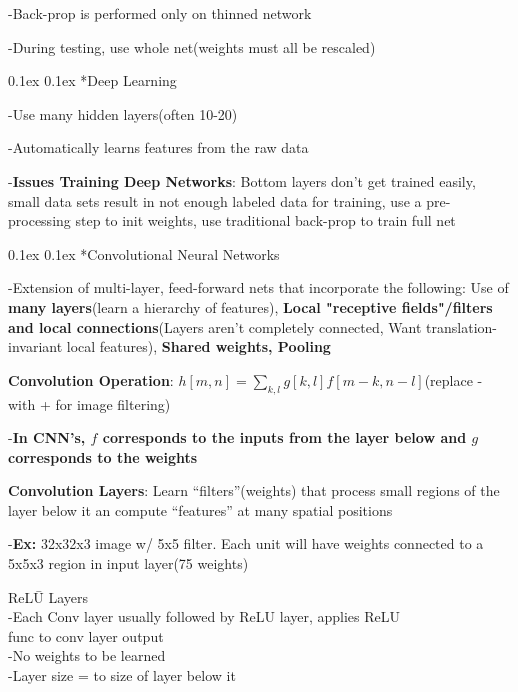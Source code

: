 \documentclass[10pt,landscape]{article}
\makeatletter
\renewcommand{\subsection}{\@startsection{subsection}{2}{0mm}%
                                {0.1ex}%
                                {0.1ex}%
                                {\normalfont\footnotesize\bfseries}}
\makeatother
\begin{document}
\begin{multicols}{3}
-Back-prop is performed only on thinned network

-During testing, use whole net(weights must all be rescaled)

\subsection{*Deep Learning}

-Use many hidden layers(often 10-20)

-Automatically learns features from the raw data

-\textbf{Issues Training Deep Networks}: Bottom layers don't get trained easily, small data sets result in not enough labeled data for training, use a pre-processing step to init weights, use traditional back-prop to train full net

\subsection{*Convolutional Neural Networks}

-Extension of multi-layer, feed-forward nets that incorporate the following: Use of \textbf{many layers}(learn a hierarchy of features), \textbf{Local "receptive fields"/filters and local connections}(Layers aren't completely connected, Want translation-invariant local features), \textbf{Shared weights, Pooling}

\textbf{Convolution Operation}: $h[m,n] = \sum_{k,l}g[k,l]f[m-k,n-l]$(replace - with + for image filtering)

-\textbf{In CNN's, $f$ corresponds to the inputs from the layer below and $g$ corresponds to the weights}

\textbf{Convolution Layers}: Learn ``filters''(weights) that process small regions of the layer below it an compute ``features'' at many spatial positions

-\textbf{Ex:} 32x32x3 image w/ 5x5 filter.  Each unit will have weights connected to a 5x5x3 region in input layer(75 weights)

\begin{tabbing}
ReL\=U Layers\\
\>-Each Conv layer usually followed by ReLU layer, applies ReLU \\\>func to conv layer output\\
\>-No weights to be learned\\
\>-Layer size = to size of layer below it\\
\end{tabbing}


\end{multicols}
\end{document}
